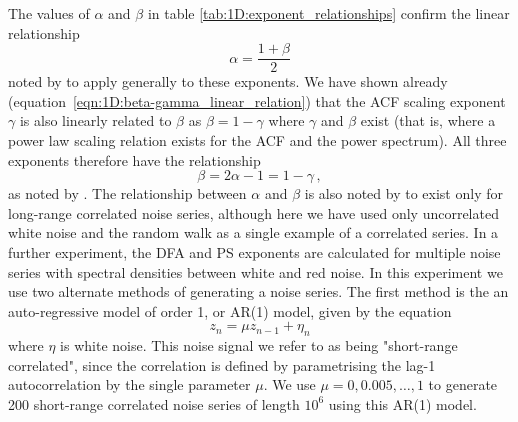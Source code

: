 {The values of $\alpha$ and $\beta$ in table \ref{tab:1D:exponent_relationships} confirm the linear relationship
	\begin{equation} 
		\alpha = \frac{1+\beta}{2} \label{eqn:1D:alphabetaExponentRelationships} 
	\end{equation}
noted by \citet{kantelhardt2001} to apply generally to these exponents. We have shown already (equation~\ref{eqn:1D:beta-gamma_linear_relation}) that the ACF scaling exponent $\gamma$ is also linearly related to $\beta$ as $\beta=1-\gamma$ where $\gamma$ and $\beta$ exist (that is, where a power law scaling relation exists for the ACF and the power spectrum). All three exponents therefore have the relationship
	\begin{equation}
		\beta = 2\alpha-1 = 1-\gamma\,,
	\end{equation} 
as noted by \cite{makse1996}. The relationship between $\alpha$ and $\beta$ is also noted by \citet{heneghan2000} to exist only for long-range correlated noise series, although here we have used only uncorrelated white noise and the random walk as a single example of a correlated series. In a further experiment, the DFA and PS exponents are calculated for multiple noise series with spectral densities between white and red noise. In this experiment we use two alternate methods of generating a noise series. The first method is the an auto-regressive model of order 1, or AR(1) model, given by the equation 
	\begin{equation}
		z_{n} = \mu z_{n-1}+\eta_{n}
	\label{eqn:1D:AR1_model}
	\end{equation}
where $\eta$ is white noise. This noise signal we refer to as being "short-range correlated", since the correlation is defined by parametrising the lag-1 autocorrelation by the single parameter $\mu$. We use $\mu=0, 0.005, \dots, 1$ to generate 200 short-range correlated noise series of length $10^6$ using this AR(1) model. 

}
